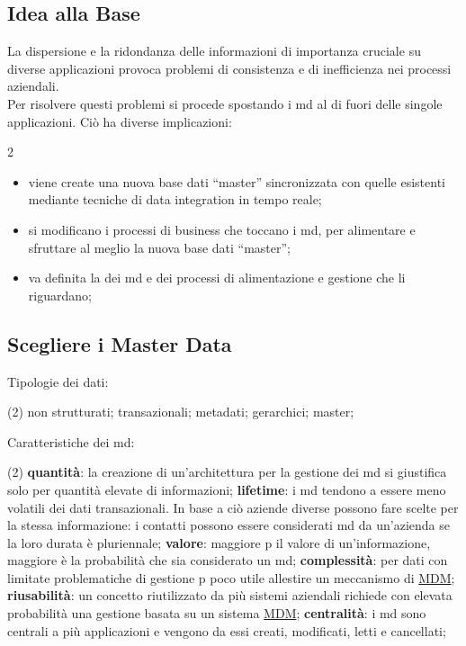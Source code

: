 \subsection{Idea alla Base}\label{sub:db_idea_alla_base} %
La dispersione e la ridondanza delle informazioni di importanza cruciale su diverse applicazioni provoca problemi di consistenza e di inefficienza nei processi aziendali.
\\
Per risolvere questi problemi si procede spostando i \ac{md} al di fuori delle singole applicazioni.
Ciò ha diverse implicazioni:
\begin{multicols}{2}
    \begin{itemize}
        \item viene create una nuova base dati ``master'' sincronizzata con quelle esistenti mediante tecniche di data integration in tempo reale;
        \item si modificano i processi di business che toccano i \ac{md}, per alimentare e sfruttare al meglio la nuova base dati ``master'';
        \item va definita la  dei \ac{md} e dei processi di alimentazione e gestione che li riguardano;
    \end{itemize}
\end{multicols}
%
\subsection{Scegliere i Master Data}\label{sub:db_scegliere_i_master_data} %
Tipologie dei dati:
\begin{tasks}(2)
    \task non strutturati;
    \task transazionali;
    \task metadati;
    \task gerarchici;
    \task master;
\end{tasks}
Caratteristiche dei \ac{md}:
\begin{tasks}(2)    
    \task \textbf{quantità}: la creazione di un'architettura per la gestione dei \ac{md} si giustifica solo per quantità elevate di informazioni;
    \task \textbf{lifetime}: i \ac{md} tendono a essere meno volatili dei dati transazionali.
        In base a ciò aziende diverse possono fare scelte per la stessa informazione: i contatti possono essere considerati \ac{md} da un'azienda se la loro durata è pluriennale;
    \task \textbf{valore}: maggiore p il valore di un'informazione, maggiore è la probabilità che sia considerato un \ac{md};
    \task \textbf{complessità}: per dati con limitate problematiche di gestione p poco utile allestire un meccanismo di \hyperref[def:mdm]{MDM};
    \task \textbf{riusabilità}: un concetto riutilizzato da più sistemi aziendali richiede con elevata probabilità una gestione basata su un sistema \hyperref[def:mdm]{MDM};
    \task \textbf{centralità}: i \ac{md} sono centrali a più applicazioni e vengono da essi creati, modificati, letti e cancellati;
\end{tasks}
%
